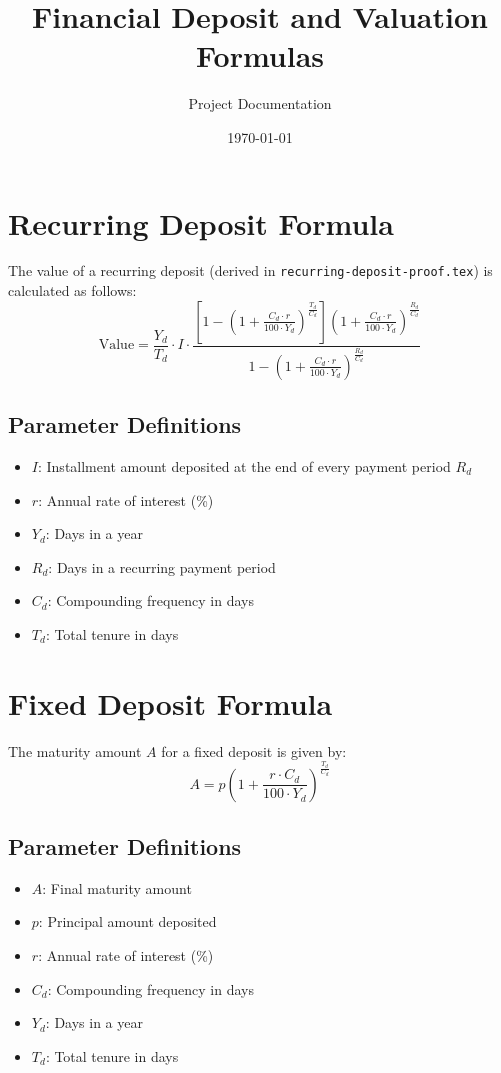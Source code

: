 \documentclass[12pt]{article}
\title{\textbf{Financial Deposit and Valuation Formulas}}
\author{Project Documentation}
\date{\today}
\begin{document}
\maketitle

\section{Recurring Deposit Formula}
The value of a recurring deposit (derived in \texttt{recurring-deposit-proof.tex}) is calculated as follows:
\[
\text{Value} = \frac{Y_d}{T_d} \cdot I \cdot \frac{\left[ 1 - \left(1 + \frac{C_d \cdot r}{100 \cdot Y_d}\right)^{\frac{T_d}{C_d}} \right] \left(1 + \frac{C_d \cdot r}{100 \cdot Y_d}\right)^{\frac{R_d}{C_d}}}{1 - \left(1 + \frac{C_d \cdot r}{100 \cdot Y_d}\right)^{\frac{R_d}{C_d}}}
\]

\subsection*{Parameter Definitions}
\begin{itemize}
    \item $I$: Installment amount deposited at the end of every payment period $R_d$
    \item $r$: Annual rate of interest (\%)
    \item $Y_d$: Days in a year
    \item $R_d$: Days in a recurring payment period
    \item $C_d$: Compounding frequency in days
    \item $T_d$: Total tenure in days
\end{itemize}

\section{Fixed Deposit Formula}
The maturity amount $A$ for a fixed deposit is given by:
\[
A = p \left( 1 + \frac{r \cdot C_d}{100 \cdot Y_d} \right)^{\frac{T_d}{C_d}}
\]

\subsection*{Parameter Definitions}
\begin{itemize}
    \item $A$: Final maturity amount
    \item $p$: Principal amount deposited
    \item $r$: Annual rate of interest (\%)
    \item $C_d$: Compounding frequency in days
    \item $Y_d$: Days in a year
    \item $T_d$: Total tenure in days
\end{itemize}
\end{document}
